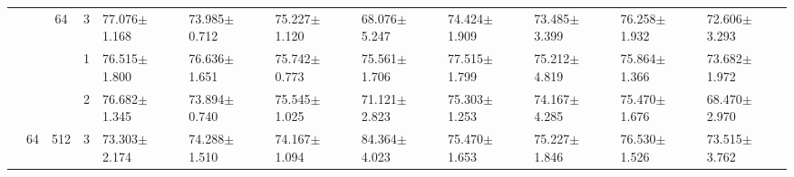\begin{table}[htpb]
{\begin{tabular}{c|c|c|c|ll|ll|ll|ll}
                                 &                                                                                 & \multirow{-3}{*}{64}                                                                   & 3                                                                                         & 77.076$\pm$1.168                        & 73.985$\pm$0.712                        & 75.227$\pm$1.120                        & 68.076$\pm$5.247                        & 74.424$\pm$1.909                        & 73.485$\pm$3.399                        & 76.258$\pm$1.932                        & 72.606$\pm$3.293                       \\ \cline{3-12} 
                                 &                                                                                 &                                                                                        & 1                                                                                         & 76.515$\pm$1.800                        & 76.636$\pm$1.651                        & 75.742$\pm$0.773                        & 75.561$\pm$1.706                        & {\color[HTML]{FE0000} 77.515$\pm$1.799} & 75.212$\pm$4.819                        & 75.864$\pm$1.366                        & 73.682$\pm$1.972                       \\
                                 &                                                                                 &                                                                                        & 2                                                                                         & 76.682$\pm$1.345                        & 73.894$\pm$0.740                        & 75.545$\pm$1.025                        & 71.121$\pm$2.823                        & 75.303$\pm$1.253                        & 74.167$\pm$4.285                        & 75.470$\pm$1.676                        & 68.470$\pm$2.970                       \\
                                 & \multirow{-6}{*}{64}                                                            & \multirow{-3}{*}{512}                                                                  & 3                                                                                         & 73.303$\pm$2.174                        & 74.288$\pm$1.510                        & 74.167$\pm$1.094                        & {\color[HTML]{FE0000} 84.364$\pm$4.023} & 75.470$\pm$1.653                        & 75.227$\pm$1.846                        & 76.530$\pm$1.526                        & 73.515$\pm$3.762                       \\ \cline{2-12} 

\end{tabular}}
\end{table}
